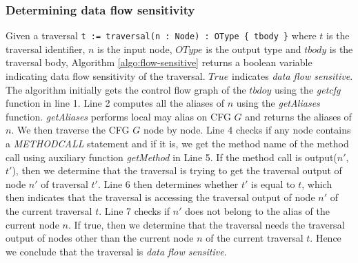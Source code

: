 \subsubsection{Determining data flow sensitivity}
\label{sec:determine-dataflow}
Given a traversal \texttt{t := traversal(n : Node) : OType \{ tbody \}} where $t$ is the traversal identifier, $n$ is the input node, $OType$ is the output type and $tbody$ is the traversal body, Algorithm \ref{algo:flow-sensitive} returns a boolean variable indicating data flow sensitivity of the traversal. $True$ indicates \textit{data flow sensitive}. The algorithm initially gets the control flow graph of the $tbdoy$ using the \textit{getcfg} function in line 1. Line 2 computes all the aliases of $n$ using the \textit{getAliases} function. \textit{getAliases} performs local may alias on CFG $G$ and returns the aliases of $n$. We then traverse the CFG $G$ node by node. Line 4 checks if any node contains a \textit{METHODCALL} statement and if it is, we get the method name of the method call using auxiliary function \textit{getMethod} in Line 5. If the method call is output($n'$, $t'$), then we determine that the traversal is trying to get the traversal output of node $n'$ of traversal $t'$. Line 6 then determines whether $t'$ is equal to $t$, which then indicates that the traversal is accessing the traversal output of node $n'$ of the current traversal $t$. Line 7 checks if $n'$ does not belong to the alias of the current node $n$. If true, then we determine that the traversal needs the traversal output of nodes other than the current node $n$ of the current traversal $t$. Hence we conclude that the traversal is \textit{data flow sensitive}.

